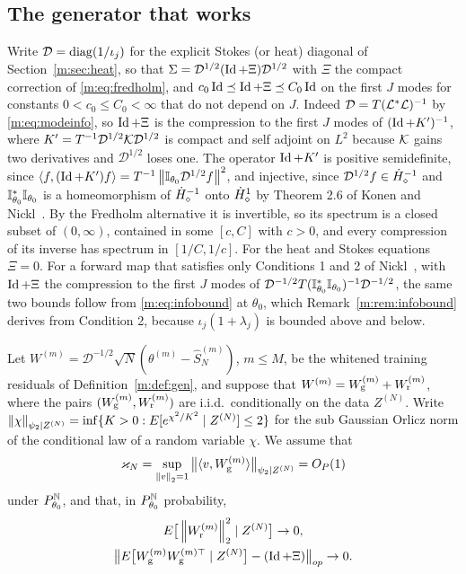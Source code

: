 \subsection{The generator that works}

Write $\mathcal D=\operatorname{diag}(1/\iota_j)$ for the explicit Stokes (or heat) diagonal of Section~\ref{m:sec:heat}, so that $\Sigma=\mathcal D^{1/2}(\operatorname{Id}+\Xi)\mathcal D^{1/2}$ with $\Xi$ the compact correction of \eqref{m:eq:fredholm}, and $c_0\operatorname{Id}\preceq\operatorname{Id}+\Xi\preceq C_0\operatorname{Id}$ on the first $J$ modes for constants $0<c_0\le C_0<\infty$ that do not depend on $J$. Indeed $\mathcal D=T(\mathcal{L}^*\mathcal{L})^{-1}$ by \eqref{m:eq:modeinfo}, so $\operatorname{Id}+\Xi$ is the compression to the first $J$ modes of $(\operatorname{Id}+K')^{-1}$, where $K'=T^{-1}\mathcal D^{1/2}\mathcal{K}\mathcal D^{1/2}$ is compact and self adjoint on $L^2$ because $\mathcal{K}$ gains two derivatives and $\mathcal D^{1/2}$ loses one. The operator $\operatorname{Id}+K'$ is positive semidefinite, since $\langle f,(\operatorname{Id}+K')f\rangle=T^{-1}\left\|\mathbb{I}_{\theta_0}\mathcal D^{1/2}f\right\|^2$, and injective, since $\mathcal D^{1/2}f\in\dot H^{-1}_\diamond$ and $\mathbb{I}^*_{\theta_0}\mathbb{I}_{\theta_0}$ is a homeomorphism of $\dot H^{-1}_\diamond$ onto $\dot H^{1}_\diamond$ by Theorem 2.6 of Konen and Nickl~\cite{konennickl2026}. By the Fredholm alternative it is invertible, so its spectrum is a closed subset of $(0,\infty)$, contained in some $[c,C]$ with $c>0$, and every compression of its inverse has spectrum in $[1/C,1/c]$. For the heat and Stokes equations $\Xi=0$. For a forward map that satisfies only Conditions 1 and 2 of Nickl~\cite{nicklbvm2024}, with $\operatorname{Id}+\Xi$ the compression to the first $J$ modes of $\mathcal D^{-1/2}T(\mathbb{I}^*_{\theta_0}\mathbb{I}_{\theta_0})^{-1}\mathcal D^{-1/2}$, the same two bounds follow from \eqref{m:eq:infobound} at $\theta_0$, which Remark~\ref{m:rem:infobound} derives from Condition 2, because $\iota_j(1+\lambda_j)$ is bounded above and below.

\begin{assumption}\label{m:ass:u2p}
Let $W^{(m)}=\mathcal D^{-1/2}\sqrt N(\theta^{(m)}-\hat S^{(m)}_N)$, $m\le M$, be the whitened training residuals of Definition~\ref{m:def:gen}, and suppose that $W^{(m)}=W^{(m)}_{\rm g}+W^{(m)}_{\rm r}$, where the pairs $(W^{(m)}_{\rm g},W^{(m)}_{\rm r})$ are i.i.d.\ conditionally on the data $Z^{(N)}$. Write $\left\|\chi\right\|_{\psi_2\mid Z^{(N)}}=\inf\{K>0:E[e^{\chi^2/K^2}\mid Z^{(N)}]\le2\}$ for the sub Gaussian Orlicz norm of the conditional law of a random variable $\chi$. We assume that
\[
\varkappa_N=\sup_{\left\|v\right\|_2=1}\big\|\langle v,W^{(m)}_{\rm g}\rangle\big\|_{\psi_2\mid Z^{(N)}}=O_P(1)
\]
under $P^{\mathbb{N}}_{\theta_0}$, and that, in $P^{\mathbb{N}}_{\theta_0}$ probability,
\[
\begin{gathered}
E\big[\left\|W^{(m)}_{\rm r}\right\|^2_2\mid Z^{(N)}\big]\to0,\\
\big\|E\big[W^{(m)}_{\rm g}W^{(m)\top}_{\rm g}\mid Z^{(N)}\big]-(\operatorname{Id}+\Xi)\big\|_{op}\to0 .
\end{gathered}
\]
\end{assumption}


